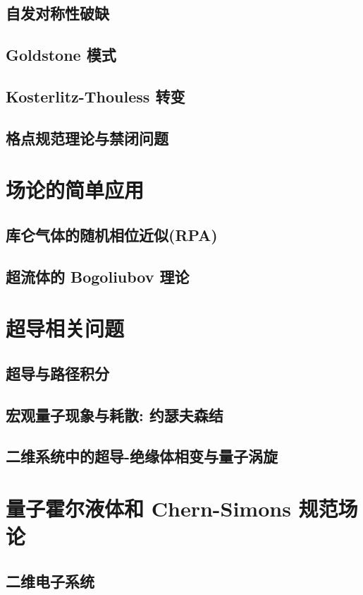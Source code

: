 \documentclass[b5paper]{book}
\begin{document}
\section{自发对称性破缺}
\section{Goldstone 模式}
\section{Kosterlitz-Thouless 转变}
\section{格点规范理论与禁闭问题}%

\chapter{场论的简单应用}
\section{库仑气体的随机相位近似(RPA)}
\section{超流体的 Bogoliubov 理论}

\chapter{超导相关问题}
\section{超导与路径积分}
\section{宏观量子现象与耗散: 约瑟夫森结}
\section{二维系统中的超导-绝缘体相变与量子涡旋}

\chapter{量子霍尔液体和 Chern-Simons 规范场论}
\section{二维电子系统}
\end{document}
